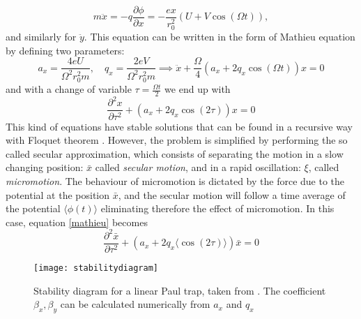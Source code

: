 \begin{equation}
m\ddot{x} = -q \frac{\partial \phi}{\partial x} = - \frac{ex}{r_0^2}\left(U + V \cos(\Omega t) \right),
\end{equation}
and similarly for $\ddot{y}$. This equation can be written in the form of Mathieu equation by defining two parameters:
\begin{equation}
a_x = \frac{4eU}{\Omega^2r_0^2m}, \quad q_x = \frac{2eV}{\Omega^2r_0^2m} \implies \ddot{x} +\frac{\Omega}{4} \left(a_x + 2q_x \cos(\Omega t )\right)x = 0
\end{equation}
and with a change of variable $\tau = \frac{\Omega t}{2}$ we end up with
\begin{equation}
\label{mathieu}
\frac{\partial^2 x}{\partial \tau^2}+\left(a_x + 2q_x \cos(2\tau)\right)x = 0
\end{equation}
This kind of equations have stable solutions that can be found in a recursive way with Floquet theorem \cite{iondynamic}. However, the problem is simplified by performing the so called secular approximation, which consists of separating the motion in a slow changing position: $\bar{x}$ called \emph{secular motion}, and in a rapid oscillation: $\xi$, called \emph{micromotion}. The behaviour of micromotion is dictated by the force due to the potential at the position $\bar{x}$, and the secular motion will follow a time average of the potential $\langle \phi(t) \rangle$ eliminating therefore the effect of micromotion. In this case, equation \eqref{mathieu} becomes
\begin{equation}
\frac{\partial^2 \bar{x}}{\partial \tau^2} + \left(a_x + 2q_x \langle\cos(2\tau)\rangle\right)\bar{x} = 0
\end{equation}

\begin{figure}[H]
\centering
\texttt{[image: stabilitydiagram]}
\caption{Stability diagram for a linear Paul trap, taken from \cite{iondynamic}. The coefficient $\beta_x,\beta_y$ can be calculated numerically from $a_x$ and $q_x$}
\label{stabilitydiagram}
\end{figure}



